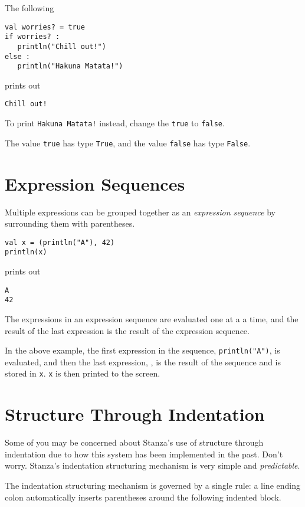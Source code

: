 \documentclass[10pt,oneside]{book}
\begin{document}
The following
\begin{lstlisting}
val worries? = true
if worries? :
   println("Chill out!")
else :
   println("Hakuna Matata!")
\end{lstlisting}
prints out
\begin{lstlisting}
Chill out!
\end{lstlisting}

To print \texttt{\frenchspacing Hakuna Matata!} instead, change the \texttt{\frenchspacing true} to \texttt{\frenchspacing false}. 

The value \texttt{\frenchspacing true} has type \texttt{\frenchspacing True}, and the value \texttt{\frenchspacing false} has type \texttt{\frenchspacing False}. 

\section{Expression Sequences}

Multiple expressions can be grouped together as an {\em expression sequence} by surrounding them with parentheses. 
\begin{lstlisting}
val x = (println("A"), 42)
println(x)
\end{lstlisting}
prints out
\begin{lstlisting}
A
42
\end{lstlisting}

The expressions in an expression sequence are evaluated one at a a time, and the result of the last expression is the result of the expression sequence.

In the above example, the first expression in the sequence, \texttt{\frenchspacing println("A")}, is evaluated, and then the last expression, \texttt{}, is the result of the sequence and is stored in \texttt{\frenchspacing x}. \texttt{\frenchspacing x} is then printed to the screen.

\section{Structure Through Indentation}

Some of you may be concerned about Stanza's use of structure through indentation due to how this system has been implemented in the past. Don't worry. Stanza's indentation structuring mechanism is very simple and {\em predictable}.

The indentation structuring mechanism is governed by a single rule: a line ending colon automatically inserts parentheses around the following indented block.
\end{document}
